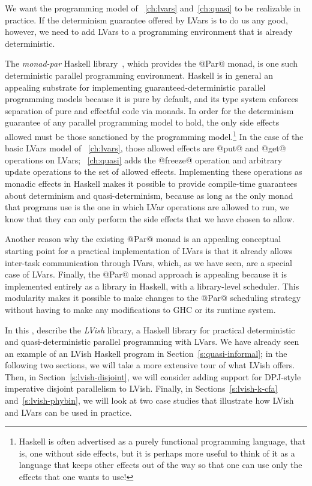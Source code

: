 We want the programming model of ~\ref{ch:lvars}
and~\ref{ch:quasi} to be realizable in practice.  If the determinism
guarantee offered by LVars is to do us any good, however, we need to
add LVars to a programming environment that is already deterministic.

The \emph{monad-par} Haskell library~\cite{monad-par}, which provides
the @Par@ monad, is one such deterministic parallel programming
environment.  Haskell is in general an appealing substrate for
implementing guaranteed-deterministic parallel programming models
because it is pure by default, and its type system enforces separation
of pure and effectful code via monads.  In order for the determinism
guarantee of any parallel programming model to hold, the only side
effects allowed must be those sanctioned by the programming
model.\footnote{Haskell is often advertised as a purely functional
programming language, that is, one without side effects, but it is
perhaps more useful to think of it as a language that keeps other
effects out of the way so that one can use only the effects that one
wants to use!}  In the case of the basic LVars model
of ~\ref{ch:lvars}, those allowed effects are
@put@ and @get@ operations on
LVars; ~\ref{ch:quasi} adds the @freeze@
operation and arbitrary update operations to the set of allowed
effects.  Implementing these operations as monadic effects in Haskell
makes it possible to provide compile-time guarantees about determinism
and quasi-determinism, because as long as the only monad that programs
use is the one in which LVar operations are allowed to run, we know
that they can only perform the side effects that we have chosen to
allow.

Another reason why the existing @Par@ monad is an appealing conceptual
starting point for a practical implementation of LVars is that it
already allows inter-task communication through IVars, which, as we
have seen, are a special case of LVars.  Finally, the @Par@ monad
approach is appealing because it is implemented entirely as a library
in Haskell, with a library-level scheduler.  This modularity makes it
possible to make changes to the @Par@ scheduling strategy without
having to make any modifications to GHC or its runtime system.

In this ,  describe
the \emph{LVish} library, a Haskell library for practical
deterministic and quasi-deterministic parallel programming with LVars.
We have already seen an example of an LVish Haskell program in
Section~\ref{s:quasi-informal}; in the following two sections, we will
take a more extensive tour of what LVish offers.  Then, in
Section~\ref{s:lvish-disjoint}, we will consider adding support for
DPJ-style imperative disjoint parallelism to LVish.  Finally, in
Sections~\ref{s:lvish-k-cfa} and~\ref{s:lvish-phybin}, we will look at
two case studies that illustrate how LVish and LVars can be used in
practice.
